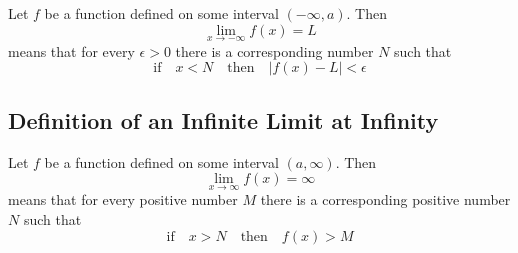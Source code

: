 Let \(f\) be a function defined on some interval \((-\infty, a)\). Then
$$ \lim_{x \to -\infty}f(x)=L$$
means that for every \(\epsilon>0\) there is a corresponding number \(N\) such that 
$$ \text{if} \quad x<N \quad \text{then} \quad |f(x)-L|<\epsilon$$ 

\subsection*{Definition of an Infinite Limit at Infinity}

Let \(f\) be a function defined on some interval \((a, \infty)\). Then
$$ \lim_{x \to \infty}f(x)=\infty$$
means that for every positive number \(M\) there is a corresponding positive number \(N\) such that 
$$ \text{if} \quad x>N \quad \text{then} \quad f(x)>M$$ 

